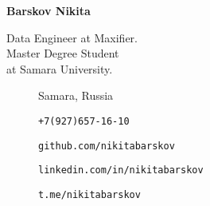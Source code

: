     \Large\textbf{Barskov Nikita}
    \normalsize
    \begin{multicols}{2}
        Data Engineer at Maxifier. \\
        Master Degree Student \\
        at Samara University.
        \begin{description}
            \item[\faMapPin] Samara, Russia
        \end{description}
        \columnbreak
        \begin{description}
            \item[\faPhone] \texttt{+7(927)657-16-10}
            \item[\faGithub] \texttt{github.com/nikitabarskov}
            \item[\faLinkedin] \texttt{linkedin.com/in/nikitabarskov}
            \item[\faPaperPlane] \texttt{t.me/nikitabarskov}
        \end{description}
    \end{multicols}